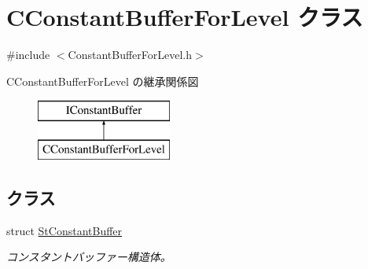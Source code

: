 \hypertarget{class_c_constant_buffer_for_level}{}\section{C\+Constant\+Buffer\+For\+Level クラス}
\label{class_c_constant_buffer_for_level}


{\ttfamily \#include $<$Constant\+Buffer\+For\+Level.\+h$>$}

C\+Constant\+Buffer\+For\+Level の継承関係図\begin{figure}[H]
\begin{center}
\leavevmode
\includegraphics[height=2.000000cm]{class_c_constant_buffer_for_level}
\end{center}
\end{figure}
\subsection*{クラス}
\begin{DoxyCompactItemize}
\item 
struct \hyperlink{struct_c_constant_buffer_for_level_1_1_st_constant_buffer}{St\+Constant\+Buffer}
\begin{DoxyCompactList}\small\item\em コンスタントバッファー構造体。 \end{DoxyCompactList}\end{DoxyCompactItemize}
